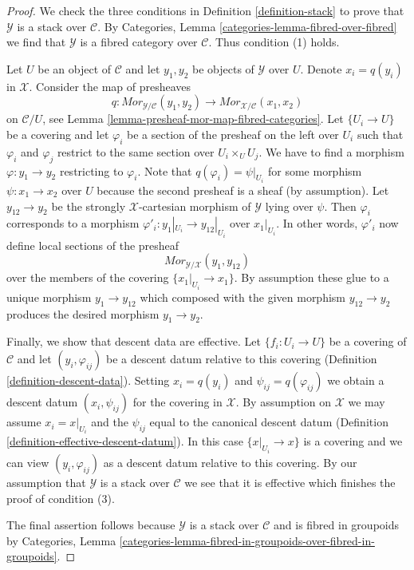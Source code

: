 \documentclass{stacks-project}
\theoremstyle{plain}
\theoremstyle{definition}
\theoremstyle{remark}
\numberwithin{equation}{subsection}
\begin{document}
\begin{proof}
We check the three conditions in Definition \ref{definition-stack}
to prove that $\mathcal{Y}$ is a stack over $\mathcal{C}$.
By Categories, Lemma \ref{categories-lemma-fibred-over-fibred}
we find that $\mathcal{Y}$ is a fibred category over $\mathcal{C}$.
Thus condition (1) holds.

\medskip\noindent
Let $U$ be an object of $\mathcal{C}$ and let $y_1, y_2$ be objects
of $\mathcal{Y}$ over $U$. Denote $x_i = q(y_i)$ in $\mathcal{X}$.
Consider the map of presheaves
$$
q : \mathit{Mor}_{\mathcal{Y}/\mathcal{C}}(y_1, y_2)
\longrightarrow
\mathit{Mor}_{\mathcal{X}/\mathcal{C}}(x_1, x_2)
$$
on $\mathcal{C}/U$, see Lemma \ref{lemma-presheaf-mor-map-fibred-categories}.
Let $\{U_i \to U\}$ be a covering and let $\varphi_i$ be a section
of the presheaf on the left over $U_i$ such that $\varphi_i$ and
$\varphi_j$ restrict to the same section over $U_i \times_U U_j$.
We have to find a morphism $\varphi : y_1 \to y_2$ restricting to $\varphi_i$.
Note that $q(\varphi_i) = \psi|_{U_i}$ for some morphism
$\psi : x_1 \to x_2$ over $U$ because the second presheaf is a sheaf
(by assumption). Let $y_{12} \to y_2$ be the strongly $\mathcal{X}$-cartesian
morphism of $\mathcal{Y}$ lying over $\psi$. Then $\varphi_i$ corresponds
to a morphism $\varphi'_i : y_1|_{U_i} \to y_{12}|_{U_i}$ over $x_1|_{U_i}$.
In other words, $\varphi'_i$ now define local sections of the presheaf
$$
\mathit{Mor}_{\mathcal{Y}/\mathcal{X}}(y_1, y_{12})
$$
over the members of the covering $\{x_1|_{U_i} \to x_1\}$. By assumption these
glue to a unique morphism $y_1 \to y_{12}$ which composed with the given
morphism $y_{12} \to y_2$ produces the desired morphism $y_1 \to y_2$.

\medskip\noindent
Finally, we show that descent data are effective. Let $\{f_i : U_i \to U\}$
be a covering of $\mathcal{C}$ and let $(y_i, \varphi_{ij})$ be a descent
datum relative to this covering (Definition \ref{definition-descent-data}).
Setting $x_i = q(y_i)$ and $\psi_{ij} = q(\varphi_{ij})$
we obtain a descent datum $(x_i, \psi_{ij})$ for the covering in $\mathcal{X}$.
By assumption on $\mathcal{X}$ we may assume $x_i = x|_{U_i}$
and the $\psi_{ij}$ equal to the canonical descent datum
(Definition \ref{definition-effective-descent-datum}).
In this case $\{x|_{U_i} \to x\}$ is a covering and we can view
$(y_i, \varphi_{ij})$ as a descent datum relative to this covering.
By our assumption that $\mathcal{Y}$ is a stack over $\mathcal{C}$
we see that it is effective which finishes the proof of condition (3).

\medskip\noindent
The final assertion follows because $\mathcal{Y}$ is a stack over
$\mathcal{C}$ and is fibred in groupoids by
Categories, Lemma
\ref{categories-lemma-fibred-in-groupoids-over-fibred-in-groupoids}.
\end{proof}
\end{document}
